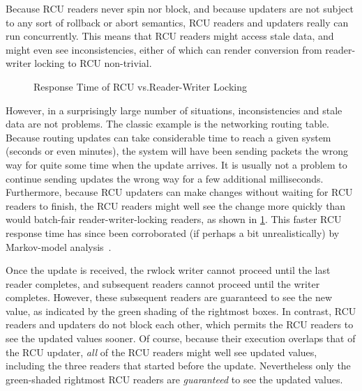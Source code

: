 Because RCU readers never spin nor block, and because updaters are not
subject to any sort of rollback or abort semantics, RCU readers and
updaters really can run concurrently.
This means that RCU readers might access stale data, and might even
see inconsistencies, either of which can render conversion from reader-writer
locking to RCU non-trivial.

\begin{figure}
\centering
{}
\caption{Response Time of RCU vs.\@ Reader-Writer Locking}
\label{fig:defer:Response Time of RCU vs. Reader-Writer Locking}
\end{figure}

However, in a surprisingly large number of situations, inconsistencies and
stale data are not problems.
The classic example is the networking routing table.
Because routing updates can take considerable time to reach a given
system (seconds or even minutes), the system will have been sending
packets the wrong way for quite some time when the update arrives.
It is usually not a problem to continue sending updates the wrong
way for a few additional milliseconds.
Furthermore, because RCU updaters can make changes without waiting for
RCU readers to finish,
the RCU readers might well see the change more quickly than would
batch-fair
reader-writer-locking readers, as shown in
\cref{fig:defer:Response Time of RCU vs. Reader-Writer Locking}.
This faster RCU response time has since been corroborated (if perhaps
a bit unrealistically) by Markov-model
analysis~\cite[Figures 3 and 5]{VishakhaRamani2023LockBasedLocklessFresh}.

\QuickQuizEnd

Once the update is received, the rwlock writer cannot proceed until the
last reader completes, and subsequent readers cannot proceed until the
writer completes.
However, these subsequent readers are guaranteed to see the new value,
as indicated by the green shading of the rightmost boxes.
In contrast, RCU readers and updaters do not block each other, which permits
the RCU readers to see the updated values sooner.
Of course, because their execution overlaps that of the RCU updater,
\emph{all} of the RCU readers might well see updated values, including
the three readers that started before the update.
Nevertheless only the green-shaded rightmost RCU readers
are \emph{guaranteed} to see the updated values.

